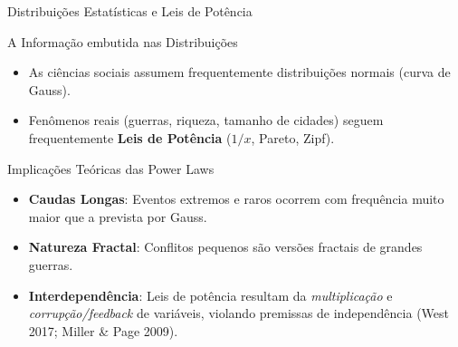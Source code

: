 \documentclass[
  ignorenonframetext,
  aspectratio=169,
  brazilian,
  t,
  10pt]{beamer}
\providecommand{\tightlist}{%
  \setlength{\itemsep}{0pt}\setlength{\parskip}{0pt}}
\begin{document}
\begin{frame}{Distribuições Estatísticas e Leis de Potência}
\protect{}\label{distribuiuxe7uxf5es-estatuxedsticas-e-leis-de-potuxeancia}
\begin{block}{A Informação embutida nas Distribuições}
\protect{}\label{a-informauxe7uxe3o-embutida-nas-distribuiuxe7uxf5es}
\begin{itemize}
\tightlist
\item
  As ciências sociais assumem frequentemente distribuições normais
  (curva de Gauss).
\item
  Fenômenos reais (guerras, riqueza, tamanho de cidades) seguem
  frequentemente \textbf{Leis de Potência} (\(1/x\), Pareto, Zipf).
\end{itemize}
\end{block}

\begin{block}{Implicações Teóricas das Power Laws}
\protect{}\label{implicauxe7uxf5es-teuxf3ricas-das-power-laws}
\begin{itemize}
\tightlist
\item
  \textbf{Caudas Longas}: Eventos extremos e raros ocorrem com
  frequência muito maior que a prevista por Gauss.
\item
  \textbf{Natureza Fractal}: Conflitos pequenos são versões fractais de
  grandes guerras.
\item
  \textbf{Interdependência}: Leis de potência resultam da
  \emph{multiplicação} e \emph{corrupção/feedback} de variáveis,
  violando premissas de independência (West 2017; Miller \& Page 2009).
\end{itemize}
\end{block}
\end{frame}
\end{document}
